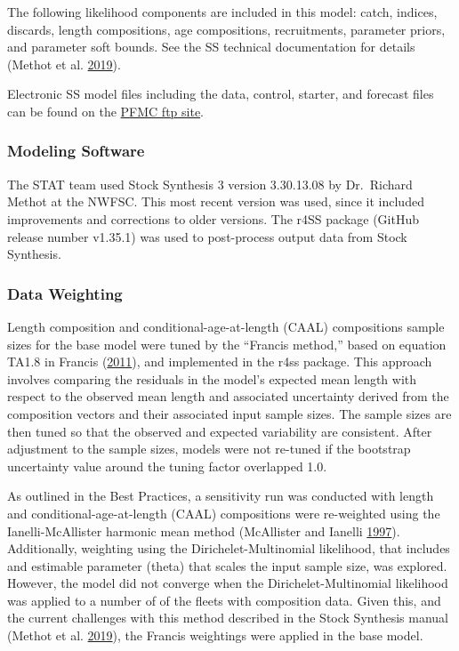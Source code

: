 \documentclass[12pt,]{article}
\begin{document}
The following likelihood components are included in this model: catch,
indices, discards, length compositions, age compositions, recruitments,
parameter priors, and parameter soft bounds. See the SS technical
documentation for details (Methot et al.
\protect\hyperlink{ref-Methot2019}{2019}).

Electronic SS model files including the data, control, starter, and
forecast files can be found on the
\href{ftp://ftp.pcouncil.org/pub/!2019\%20GF\%20STAR\%20Panels/STAR\%20Panel\%204\%20-\%20Cowcod-Gopher/}{PFMC
ftp site}.

\subsubsection{Modeling Software}\label{modeling-software}

The STAT team used Stock Synthesis 3 version 3.30.13.08 by Dr.~Richard
Methot at the NWFSC. This most recent version was used, since it
included improvements and corrections to older versions. The r4SS
package (GitHub release number v1.35.1) was used to post-process output
data from Stock Synthesis.

\subsubsection{Data Weighting}\label{data-weighting}

Length composition and conditional-age-at-length (CAAL) compositions
sample sizes for the base model were tuned by the ``Francis method,''
based on equation TA1.8 in Francis
(\protect\hyperlink{ref-Francis2011}{2011}), and implemented in the r4ss
package. This approach involves comparing the residuals in the model's
expected mean length with respect to the observed mean length and
associated uncertainty derived from the composition vectors and their
associated input sample sizes. The sample sizes are then tuned so that
the observed and expected variability are consistent. After adjustment
to the sample sizes, models were not re-tuned if the bootstrap
uncertainty value around the tuning factor overlapped 1.0.

As outlined in the Best Practices, a sensitivity run was conducted with
length and conditional-age-at-length (CAAL) compositions were
re-weighted using the Ianelli-McAllister harmonic mean method
(McAllister and Ianelli \protect\hyperlink{ref-McAllister1997}{1997}).
Additionally, weighting using the Dirichelet-Multinomial likelihood,
that includes and estimable parameter (theta) that scales the input
sample size, was explored. However, the model did not converge when the
Dirichelet-Multinomial likelihood was applied to a number of of the
fleets with composition data. Given this, and the current challenges
with this method described in the Stock Synthesis manual (Methot et al.
\protect\hyperlink{ref-Methot2019}{2019}), the Francis weightings were
applied in the base model.
\end{document}
